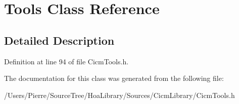 \hypertarget{class_tools}{\section{Tools Class Reference}
\label{class_tools}
}


\subsection{Detailed Description}


Definition at line 94 of file Cicm\-Tools.\-h.



The documentation for this class was generated from the following file\-:\begin{DoxyCompactItemize}
\item 
/\-Users/\-Pierre/\-Source\-Tree/\-Hoa\-Library/\-Sources/\-Cicm\-Library/Cicm\-Tools.\-h\end{DoxyCompactItemize}
